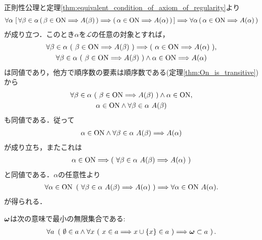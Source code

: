 	\begin{prf}
		正則性公理と定理\ref{thm:equivalent_condition_of_axiom_of_regularity}より
		\begin{align}
			\forall \alpha\, \left[\, \forall \beta \in \alpha\, (\, \beta \in \mathrm{ON} \Longrightarrow A(\beta)\, )
			\Longrightarrow (\, \alpha \in \mathrm{ON} \Longrightarrow A(\alpha)\, )\, \right]
			\Longrightarrow \forall \alpha\, (\, \alpha \in \mathrm{ON} \Longrightarrow A(\alpha)\, )
		\end{align}
		が成り立つ．このとき$\alpha$を$\mathcal{L}$の任意の対象とすれば，
		\begin{align}
			\begin{gathered}
				\forall \beta \in \alpha\ (\ \beta \in \mathrm{ON} \Longrightarrow A(\beta)\ )
				\Longrightarrow (\ \alpha \in \mathrm{ON} \Longrightarrow A(\alpha)\ ), \\
				\forall \beta \in \alpha\ (\ \beta \in \mathrm{ON} \Longrightarrow A(\beta)\ ) \wedge \alpha \in \mathrm{ON} \Longrightarrow A(\alpha)
			\end{gathered}
		\end{align}
		は同値であり，他方で順序数の要素は順序数である(定理\ref{thm:On_is_transitive})から
		\begin{align}
			\begin{gathered}
				\forall \beta \in \alpha\ (\ \beta \in \mathrm{ON} \Longrightarrow A(\beta)\ ) \wedge \alpha \in \mathrm{ON}, \\
				\alpha \in \mathrm{ON} \wedge \forall \beta \in \alpha\ A(\beta)
			\end{gathered}
		\end{align}
		も同値である．従って
		\begin{align}
			\alpha \in \mathrm{ON} \wedge \forall \beta \in \alpha\ A(\beta)
			\Longrightarrow A(\alpha)
		\end{align}
		が成り立ち，またこれは
		\begin{align}
			\alpha \in \mathrm{ON} \Longrightarrow \left(\ \forall \beta \in \alpha\ A(\beta)
			\Longrightarrow A(\alpha)\ \right)
		\end{align}
		と同値である．$\alpha$の任意性より
		\begin{align}
			\forall \alpha \in \ON\ 
			\left(\ \forall \beta \in \alpha\ A(\beta)
			\Longrightarrow A(\alpha)\ \right)
			\Longrightarrow \forall \alpha \in \ON\ A(\alpha).
		\end{align}
		が得られる．
		\QED
	\end{prf}
	
	\begin{screen}
		\begin{thm}[数学的帰納法の原理]
		\label{thm:the_principle_of_mathematical_induction}
			${\boldsymbol \omega}$は次の意味で最小の無限集合である:
			\begin{align}
				\forall a\ \left(\ \emptyset \in a \wedge \forall x\ 
				(\ x \in a \Longrightarrow x \cup \{x\} \in a\ ) 
				\Longrightarrow \omg \subset a\ \right).
			\end{align}
		\end{thm}
	\end{screen}
	
